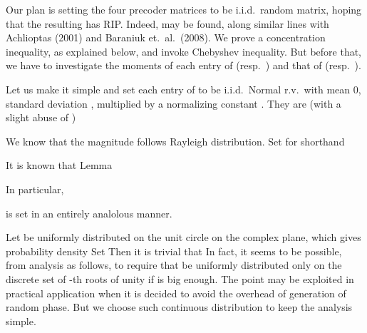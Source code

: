 \startsection [title={Confirming Restricted Isometry of Beamformer (Deprecated)}]
\startsubsection [title={Design of Digital Beamformer Entries}]

Our plan is setting the four precoder matrices to be i.i.d.\ random matrix, hoping that the resulting  has RIP.
Indeed,  may be found, along similar lines with Achlioptas (2001) and Baraniuk et.\ al.\ (2008).
We prove a concentration inequality, as explained below, and invoke Chebyshev inequality.
But before that, we have to investigate the moments of each entry of  (resp.\ ) and that of  (resp.\ ).

Let us make it simple and set each entry of  to be i.i.d.\ Normal r.v.\ with mean 0, standard deviation , multiplied by a normalizing constant .
They are (with a slight abuse of )

We know that the magnitude  follows Rayleigh distribution.
Set for shorthand

It is known that
\Result
{Lemma}
{
}

In particular,

 is set in an entirely analolous manner.

\stopsubsection

\startsubsection [title={Design of Analog Beamformer Entries}]

Let  be uniformly distributed on the unit circle on the complex plane, which gives probability density
Set
Then it is trivial that
In fact, it seems to be possible, from analysis as follows, to require that  be uniformly distributed only on the discrete set of -th roots of unity if  is big enough.
The point may be exploited in practical application when it is decided to avoid the overhead of generation of random phase.
But we choose such continuous distribution to keep the analysis simple.

